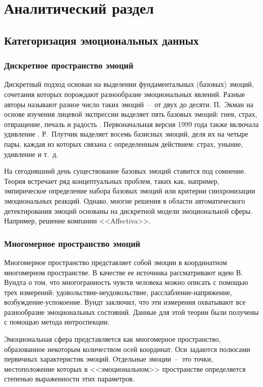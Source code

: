 \chapter{Аналитический раздел}
\section{Категоризация эмоциональных данных}
\subsection{Дискретное пространство эмоций}
Дискретный подход основан на выделении фундаментальных (базовых) эмоций, сочетания которых порождают разнообразие эмоциональных явлений. Разные авторы называют разное число таких эмоций~--~от двух до десяти. П.~Экман на основе изучения лицевой экспрессии выделяет пять базовых эмоций: гнев, страх, отвращение, печаль и радость \cite{Ekman1972}. Первоначальная версия 1999 года также включала удивление \cite{Ekman1992}. Р.~Плутчик \cite{Plutchik1980} выделяет восемь базисных эмоций, деля их на четыре пары, каждая из которых связана с определенным действием: страх, уныние, удивление и т.~д. 

На сегодняшний день существование базовых эмоций ставится под сомнение. Теория встречает ряд концептуальных проблем, таких как, например, эмпирическое определение набора базовых эмоций или критерии синхронизации эмоциональных реакций. Однако, многие решения в области автоматического детектирования эмоций основаны на дискретной модели эмоциональной сферы. Например, решение компании <<Affectiva>>.~\cite{Affectica}

\subsection{Многомерное пространство эмоций}
Многомерное пространство представляет собой эмоции в координатном многомерном пространстве. В качестве ее источника рассматривают идею В. Вундта о том, что многогранность чувств
человека можно описать с помощью трех измерений: удовольствие-неудовольствие, расслабление-напряжение, возбуждение-успокоение. Вундт заключил, \cite{Вундт1984} что эти измерения охватывают все разнообразие эмоциональных состояний. Данные для этой теории были получены с помощью метода интроспекции.

Эмоциональная сфера представляется как многомерное пространство, образованное некоторым
количеством осей координат. Оси задаются полюсами первичных характеристик эмоций. Отдельные эмоции~--~это точки, местоположение которых в <<эмоциональном>> пространстве определяется степенью выраженности этих параметров.

